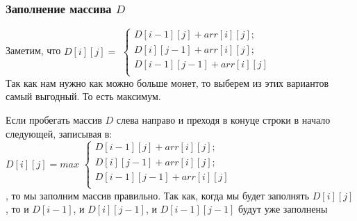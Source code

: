 \documentclass[handout]{beamer}
\begin{document}
\begin{frame}

\transdissolve[duration=0.2]
\frametitle{Заполнение массива $D$}

\begin{block}{}
Заметим, что $D[i][j] = $
$\begin{cases}
D[i-1][j] + arr[i][j];\\
D[i][j-1] + arr[i][j];\\
D[i-1][j-1] + arr[i][j]\\
\end{cases}$\\
Так как нам нужно как можно больше монет, то выберем из этих вариантов самый выгодный. То есть максимум.
\end{block}

\begin{block}{}
Если пробегать массив $D$ слева направо и преходя в конуце строки в начало следующей, записывая в:\\
$D[i][j] = max $
$\begin{cases}
D[i-1][j] + arr[i][j];\\
D[i][j-1] + arr[i][j];\\
D[i-1][j-1] + arr[i][j]\\
\end{cases}$\\
, то мы заполним массив правильно. Так как, когда мы будет заполнять $D[i][j]$, то и $D[i-1]$, и $D[i][j-1]$, и $D[i-1][j-1]$ будут уже заполнены
\end{block}
\end{frame}
\end{document}
